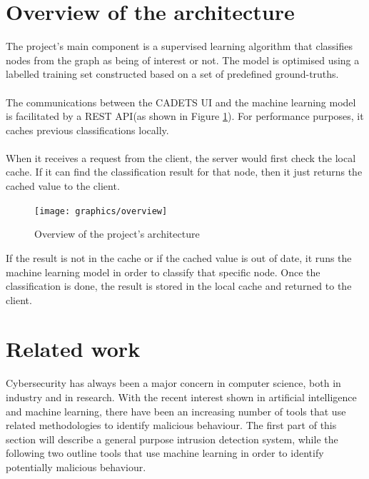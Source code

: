 	\section{Overview of the architecture}\label{1.2}
	The project's main component is a supervised learning algorithm that classifies nodes from the graph as being of interest or not. The model is optimised using a labelled training set constructed based on a set of predefined ground-truths.
	\\ \\
	The communications between the CADETS UI and the machine learning model is facilitated by a REST API(as shown in Figure \ref{Figure 1.2}). For performance purposes, it caches previous classifications locally. 
	\\ \\ 
	When it receives a request from the client, the server would first check the local cache. If it can find the classification result for that node, then it just returns the cached value to the client.
	\begin{figure}[H]
		\centering
		\texttt{[image: graphics/overview]}
		\caption{Overview of the project's architecture}
		\label{Figure 1.2}
	\end{figure}
	
	If the result is not in the cache or if the cached value is out of date, it runs the machine learning model in order to classify that specific node. Once the classification is done, the result is stored in the local cache and returned to the client. 
	
	\section{Related work}
	Cybersecurity has always been a major concern in computer science, both in industry and in research. With the recent interest shown in artificial intelligence and machine learning, there have been an increasing number of tools that use related methodologies to identify malicious behaviour. The first 
	part of this section will describe a general purpose intrusion detection system, while the following two outline tools that use machine learning in order to identify potentially malicious behaviour.
	
